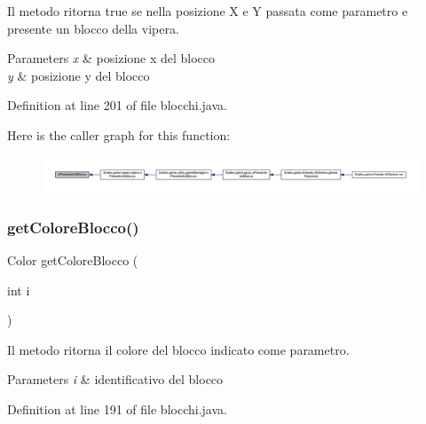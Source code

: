 Il metodo ritorna true se nella posizione X e Y passata come parametro e\textquotesingle{} presente un blocco della vipera. 


\begin{DoxyParams}{Parameters}
{\em x} & posizione x del blocco \\
\hline
{\em y} & posizione y del blocco \\
\hline
\end{DoxyParams}


Definition at line 201 of file blocchi.\+java.

Here is the caller graph for this function\+:
\nopagebreak
\begin{figure}[H]
\begin{center}
\leavevmode
\includegraphics[width=350pt]{class_snake_1_1game_1_1vipera_1_1blocchi_ac24833a417b3bd7c60e29ed5b7edc29f_icgraph}
\end{center}
\end{figure}
\mbox{\label{class_snake_1_1game_1_1vipera_1_1blocchi_a6c5d6f8c561308ff9ec579b370a969e0}} 
\subsubsection{\texorpdfstring{get\+Colore\+Blocco()}{getColoreBlocco()}}
{\footnotesize\ttfamily Color get\+Colore\+Blocco (\begin{DoxyParamCaption}\item[{int}]{i }\end{DoxyParamCaption})}



Il metodo ritorna il colore del blocco indicato come parametro. 


\begin{DoxyParams}{Parameters}
{\em i} & identificativo del blocco \\
\hline
\end{DoxyParams}


Definition at line 191 of file blocchi.\+java.

